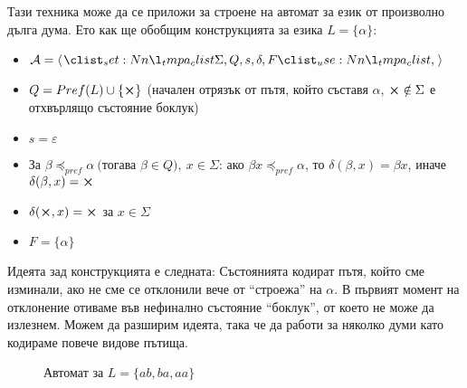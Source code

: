 \pagebreak

Тази техника може да се приложи за строене на автомат за език от произволно дълга дума.
Ето как ще обобщим конструкцията за езика $L = \{ \alpha \}$:
\begin{itemize}
    \item $\mathcal{A} = \opair{\Sigma, Q, s, \delta, F}$
    \item $Q = Pref(L) \cup \{ \cross \}$ (начален отрязък от пътя, който съставя $\alpha$, $\cross \notin \Sigma$ е отхвърлящо състояние боклук)
    \item $s = \varepsilon$
    \item За $\beta \preceq_{pref} \alpha \: ($тогава $\beta \in Q), \: x \in \Sigma$:
          ако $\beta x \preceq_{pref} \alpha$, то $\delta(\beta, x) = \beta x$,
          иначе $\delta(\beta, x) = \cross$
    \item $\delta(\cross, x) = \cross$ за $x \in \Sigma$
    \item $F = \{ \alpha \}$
\end{itemize}

Идеята зад конструкцията е следната:
Състоянията кодират пътя, който сме изминали, ако не сме се отклонили вече от ``строежа'' на $\alpha$.
В първият момент на отклонение отиваме във нефинално състояние ``боклук'', от което не може да излезнем.
Можем да разширим идеята, така че да работи за няколко думи като кодираме повече видове пътища.

\pagebreak

\begin{figure*}
    \centering
    \caption*{Автомат за $L = \{ ab, ba, aa \}$}
\end{figure*}

